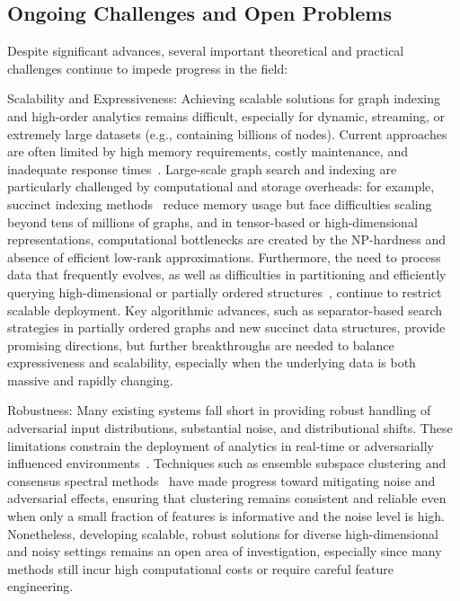 \documentclass[sigconf]{acmart}
\begin{document}
\subsection{Ongoing Challenges and Open Problems}

Despite significant advances, several important theoretical and practical challenges continue to impede progress in the field:

Scalability and Expressiveness: Achieving scalable solutions for graph indexing and high-order analytics remains difficult, especially for dynamic, streaming, or extremely large datasets (e.g., containing billions of nodes). Current approaches are often limited by high memory requirements, costly maintenance, and inadequate response times~\cite{ref104,ref107}. Large-scale graph search and indexing are particularly challenged by computational and storage overheads: for example, succinct indexing methods~\cite{ref106} reduce memory usage but face difficulties scaling beyond tens of millions of graphs, and in tensor-based or high-dimensional representations, computational bottlenecks are created by the NP-hardness and absence of efficient low-rank approximations. Furthermore, the need to process data that frequently evolves, as well as difficulties in partitioning and efficiently querying high-dimensional or partially ordered structures~\cite{ref107}, continue to restrict scalable deployment. Key algorithmic advances, such as separator-based search strategies in partially ordered graphs and new succinct data structures, provide promising directions, but further breakthroughs are needed to balance expressiveness and scalability, especially when the underlying data is both massive and rapidly changing.

Robustness: Many existing systems fall short in providing robust handling of adversarial input distributions, substantial noise, and distributional shifts. These limitations constrain the deployment of analytics in real-time or adversarially influenced environments~\cite{ref106}. Techniques such as ensemble subspace clustering and consensus spectral methods~\cite{ref116} have made progress toward mitigating noise and adversarial effects, ensuring that clustering remains consistent and reliable even when only a small fraction of features is informative and the noise level is high. Nonetheless, developing scalable, robust solutions for diverse high-dimensional and noisy settings remains an open area of investigation, especially since many methods still incur high computational costs or require careful feature engineering.
\end{document}
